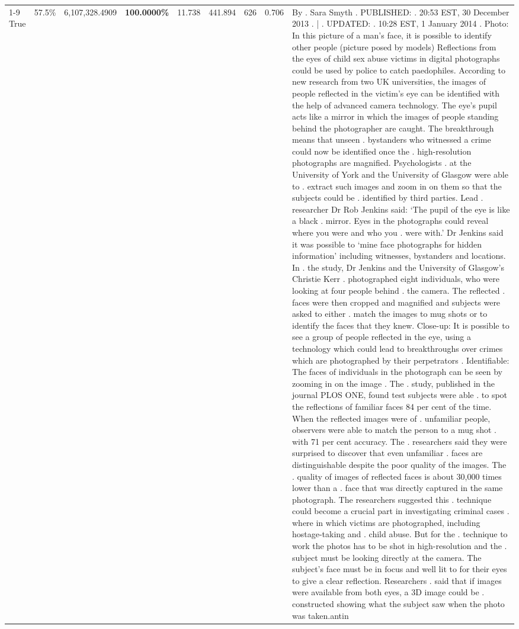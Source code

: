 \begin{table}[H]
\begin{tabular}{lllrlllll}
\cline{1-9}
True & 57.5\% & 6,107,328.4909 & \bfseries \color{red} 100.0000\% & 11.738 & 441.894 & 626 & 0.706 & By . Sara Smyth . PUBLISHED: . 20:53 EST, 30 December 2013 . | . UPDATED: . 10:28 EST, 1 January 2014 . Photo: In this picture of a man's face, it is possible to identify other people (picture posed by models) Reflections from the eyes of child sex abuse victims in digital photographs could be used by police to catch paedophiles. According to new research from two UK universities, the images of people reflected in the victim's eye can be identified with the help of advanced camera technology. The eye's pupil acts like a mirror in which the images of people standing behind the photographer are caught. The breakthrough means that unseen . bystanders who witnessed a crime could now be identified once the . high-resolution photographs are magnified. Psychologists . at the University of York and the University of Glasgow were able to . extract such images and zoom in on them so that the subjects could be . identified by third parties. Lead . researcher Dr Rob Jenkins said: ‘The pupil of the eye is like a black . mirror. Eyes in the photographs could reveal where you were and who you . were with.' Dr Jenkins said it was possible to ‘mine face photographs for hidden information' including witnesses, bystanders and locations. In . the study, Dr Jenkins and the University of Glasgow's Christie Kerr . photographed eight individuals, who were looking at four people behind . the camera. The reflected . faces were then cropped and magnified and subjects were asked to either . match the images to mug shots or to identify the faces that they knew. Close-up: It is possible to see a group of people reflected in the eye, using a technology which could lead to breakthroughs over crimes which are photographed by their perpetrators . Identifiable: The faces of individuals in the photograph can be seen by zooming in on the image . The . study, published in the journal PLOS ONE, found test subjects were able . to spot the reflections of familiar faces 84 per cent of the time. When the reflected images were of . unfamiliar people, observers were able to match the person to a mug shot . with 71 per cent accuracy. The . researchers said they were surprised to discover that even unfamiliar . faces are distinguishable despite the poor quality of the images. The . quality of images of reflected faces is about 30,000 times lower than a . face that was directly captured in the same photograph. The researchers suggested this . technique could become a crucial part in investigating criminal cases . where in which victims are photographed, including hostage-taking and . child abuse. But for the . technique to work the photos has to be shot in high-resolution and the . subject must be looking directly at the camera. The subject's face must be in focus and well lit to for their eyes to give a clear reflection. Researchers . said that if images were available from both eyes, a 3D image could be . constructed showing what the subject saw when the photo was taken.antin \\

\end{tabular}
\end{table}
